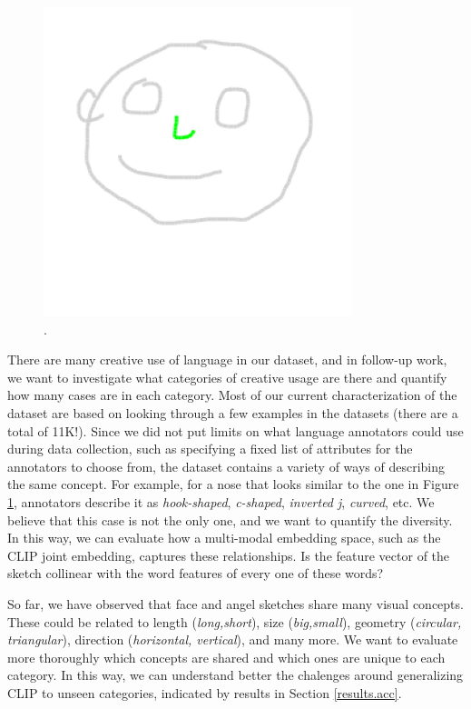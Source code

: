 \begin{figure}[!htb]
\centering
\includegraphics[width=0.3\linewidth]{future/future_nose_variety_392.png}  
\caption{.}
\label{results.hookNose}
\end{figure}
There are many creative use of language in our dataset, and in follow-up work, we want to investigate what categories of creative usage are there and quantify how many cases are in each category. 
Most of our current characterization of the dataset are based on looking through a few examples in the datasets (there are a total of 11K!).
Since we did not put limits on what language annotators could use during data collection, such as specifying a fixed list of attributes for the annotators to choose from, the dataset contains a variety of ways of describing the same concept. For example, for a nose that looks similar to the one in Figure \ref{results.hookNose}, annotators describe it as \textit{hook-shaped}, \textit{c-shaped}, \textit{inverted j}, \textit{curved}, etc. We believe that this case is not the only one, and we want to quantify the diversity. In this way, we can evaluate how a multi-modal embedding space, such as the CLIP joint embedding, captures these relationships. Is the feature vector of the sketch collinear with the word features of every one of these words?          

So far, we have observed that face and angel sketches share many visual concepts. These could be related to length (\textit{long,short}), size (\textit{big,small}), geometry (\textit{circular, triangular}), direction (\textit{horizontal, vertical}), and many more. We want to evaluate more thoroughly which concepts are shared and which ones are unique to each category. In this way, we can understand better the chalenges around generalizing CLIP to unseen categories, indicated by results in Section \ref{results.acc}. 



